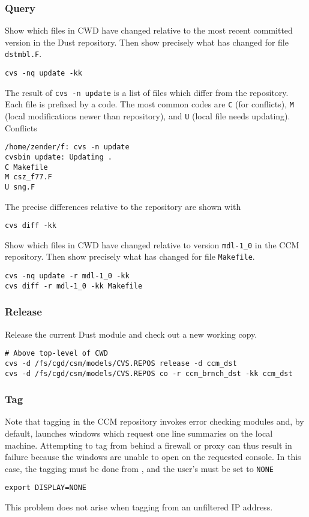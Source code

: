 \documentclass[12pt,twoside]{article}
\begin{document}
\subsubsection[Query]{Query}
Show which files in CWD have changed relative to the most recent
committed version in the Dust repository.
Then show precisely what has changed for file \verb'dstmbl.F'.
\begin{verbatim}
cvs -nq update -kk
\end{verbatim}
The result of \verb'cvs -n update' is a list of files which differ
from the repository. 
Each file is prefixed by a code.
The most common codes are \verb'C' (for conflicts), \verb'M'
(local modifications newer than repository), and \verb'U' (local file
needs updating).
Conflicts 
\begin{verbatim}
/home/zender/f: cvs -n update
cvsbin update: Updating .
C Makefile
M csz_f77.F
U sng.F
\end{verbatim}
The precise differences relative to the repository are shown with
\begin{verbatim}
cvs diff -kk
\end{verbatim}
Show which files in CWD have changed relative to version
\verb'mdl-1_0' in the CCM repository.
Then show precisely what has changed for file \verb'Makefile'.
\begin{verbatim}
cvs -nq update -r mdl-1_0 -kk
cvs diff -r mdl-1_0 -kk Makefile
\end{verbatim}

\subsubsection[Release]{Release}
Release the current Dust module and check out a new working copy. 
\begin{verbatim}
# Above top-level of CWD
cvs -d /fs/cgd/csm/models/CVS.REPOS release -d ccm_dst
cvs -d /fs/cgd/csm/models/CVS.REPOS co -r ccm_brnch_dst -kk ccm_dst
\end{verbatim}

\subsubsection[Tag]{Tag}
Note that tagging in the CCM repository invokes error checking modules
and, by default, launches windows which request one line summaries
on the local machine.
Attempting to tag from behind a firewall or proxy can thus result in 
failure because the windows are unable to open on the requested
console.
In this case, the tagging must be done from
, and the user's  must be
set to \verb'NONE'
\begin{verbatim}
export DISPLAY=NONE
\end{verbatim}
This problem does not arise when tagging from an unfiltered IP address.
\end{document}
